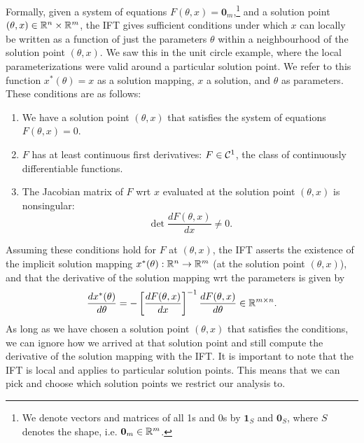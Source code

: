 \documentclass[11pt]{article}
\begin{document}
Formally, given a system of equations $F(\theta, x) = \mathbf{0}_m$,\footnote{
We denote vectors and matrices of all 1s and 0s by $\mathbf{1}_S$
and $\mathbf{0}_S$, where $S$ denotes the shape, i.e. $\mathbf{0}_m\in\mathbb{R}^m$.
}
and a solution point $(\theta,x) \in \mathbb{R}^n\times\mathbb{R}^m$,
the IFT gives sufficient conditions under which $x$ can locally be written as a function
of just the parameters $\theta$ within a neighbourhood of the solution point $(\theta,x)$.
We saw this in the unit circle example, where the local parameterizations were
valid around a particular solution point.
We refer to this function $x^*(\theta) = x$ as a solution mapping,
$x$ a solution, and $\theta$ as parameters.
These conditions are as follows:
\begin{enumerate}
\item We have a solution point $(\theta, x)$ that satisfies the system of equations
    $F(\theta, x) = 0$.
\item $F$ has at least continuous first derivatives: $F \in \mathcal{C}^1$,
    the class of continuously differentiable functions.
\item The Jacobian matrix
    of $F$ wrt $x$ evaluated at the solution point $(\theta,x)$ is nonsingular:
    \[
    \det \frac{d F(\theta,x)}{d x} \neq 0.
    \]
\end{enumerate}
Assuming these conditions hold for $F$ at $(\theta,x)$, the IFT
asserts the existence of the implicit solution mapping $x^*(\theta):\mathbb{R}^n\to\mathbb{R}^m$
(at the solution point $(\theta,x)$),
and that the derivative of the solution mapping wrt the parameters is given by
\begin{equation}
    \label{eqn:iftderiv}
    \frac{d x^*(\theta)}{d\theta} = -\left[\frac{dF(\theta,x)}{dx}\right]^{-1}
    \frac{d F(\theta,x)}{d\theta} \in \mathbb{R}^{m\times n}.
\end{equation}
As long as we have chosen a solution point $(\theta,x)$ that satisfies the conditions,
we can ignore how we arrived at that solution point and still compute the derivative
of the solution mapping with the IFT.
It is important to note that the IFT is local and applies to particular solution points.
This means that we can pick and choose which solution points we restrict our analysis to.
\end{document}
